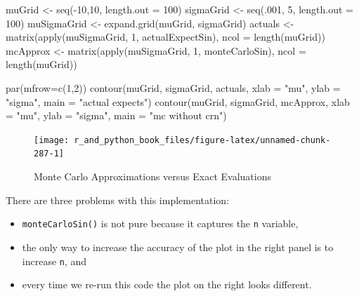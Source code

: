\documentclass[
  12pt,
  krantz2]{krantz}
\makeatletter
\newenvironment{Shaded}{\begin{snugshade}}{\end{snugshade}}
\newcommand{\AttributeTok}[1]{\textcolor[rgb]{0.61,0.61,0.61}{#1}}
\newcommand{\DecValTok}[1]{\textcolor[rgb]{0.06,0.06,0.06}{#1}}
\newcommand{\FunctionTok}[1]{\textcolor[rgb]{0,0,0}{#1}}
\newcommand{\NormalTok}[1]{#1}
\newcommand{\OtherTok}[1]{\textcolor[rgb]{0.37,0.37,0.37}{#1}}
\newcommand{\SpecialCharTok}[1]{\textcolor[rgb]{0,0,0}{#1}}
\newcommand{\StringTok}[1]{\textcolor[rgb]{0.5,0.5,0.5}{#1}}
\providecommand{\tightlist}{%
  \setlength{\itemsep}{0pt}\setlength{\parskip}{0pt}}
\newenvironment{kframe}{%
\medskip{}
\setlength{\fboxsep}{.8em}
 \def\at@end@of@kframe{}%
 \ifinner\ifhmode%
  \def\at@end@of@kframe{\end{minipage}}%
  \begin{minipage}{\columnwidth}%
 \fi\fi%
 \def\FrameCommand##1{\hskip\@totalleftmargin \hskip-\fboxsep
 \colorbox{shadecolor}{##1}\hskip-\fboxsep
     \hskip-\linewidth \hskip-\@totalleftmargin \hskip\columnwidth}%
 \MakeFramed {\advance\hsize-\width
   \@totalleftmargin\z@ \linewidth\hsize
   \@setminipage}}%
 {\par\unskip\endMakeFramed%
 \at@end@of@kframe}
\renewenvironment{Shaded}{\begin{kframe}}{\end{kframe}}
\makeatother
\begin{document}
\begin{Shaded}
\begin{Highlighting}[]
\NormalTok{muGrid }\OtherTok{\textless{}{-}} \FunctionTok{seq}\NormalTok{(}\SpecialCharTok{{-}}\DecValTok{10}\NormalTok{,}\DecValTok{10}\NormalTok{, }\AttributeTok{length.out =} \DecValTok{100}\NormalTok{)}
\NormalTok{sigmaGrid }\OtherTok{\textless{}{-}} \FunctionTok{seq}\NormalTok{(.}\DecValTok{001}\NormalTok{, }\DecValTok{5}\NormalTok{, }\AttributeTok{length.out =} \DecValTok{100}\NormalTok{)}
\NormalTok{muSigmaGrid }\OtherTok{\textless{}{-}} \FunctionTok{expand.grid}\NormalTok{(muGrid, sigmaGrid)}
\NormalTok{actuals }\OtherTok{\textless{}{-}}  \FunctionTok{matrix}\NormalTok{(}\FunctionTok{apply}\NormalTok{(muSigmaGrid, }\DecValTok{1}\NormalTok{, actualExpectSin), }
                   \AttributeTok{ncol =} \FunctionTok{length}\NormalTok{(muGrid))}
\NormalTok{mcApprox }\OtherTok{\textless{}{-}} \FunctionTok{matrix}\NormalTok{(}\FunctionTok{apply}\NormalTok{(muSigmaGrid, }\DecValTok{1}\NormalTok{, monteCarloSin), }
                   \AttributeTok{ncol =} \FunctionTok{length}\NormalTok{(muGrid))}

\FunctionTok{par}\NormalTok{(}\AttributeTok{mfrow=}\FunctionTok{c}\NormalTok{(}\DecValTok{1}\NormalTok{,}\DecValTok{2}\NormalTok{))}
\FunctionTok{contour}\NormalTok{(muGrid, sigmaGrid, actuals, }
        \AttributeTok{xlab =} \StringTok{"mu"}\NormalTok{, }\AttributeTok{ylab =} \StringTok{"sigma"}\NormalTok{, }\AttributeTok{main =} \StringTok{"actual expects"}\NormalTok{)}
\FunctionTok{contour}\NormalTok{(muGrid, sigmaGrid, mcApprox, }
        \AttributeTok{xlab =} \StringTok{"mu"}\NormalTok{, }\AttributeTok{ylab =} \StringTok{"sigma"}\NormalTok{, }\AttributeTok{main =} \StringTok{"mc without crn"}\NormalTok{)}
\end{Highlighting}
\end{Shaded}

\begin{figure}

{\centering \texttt{[image: r\_and\_python\_book\_files/figure-latex/unnamed-chunk-287-1]} 

}

\caption{Monte Carlo Approximations versus Exact Evaluations}\label{fig:unnamed-chunk-287}
\end{figure}

There are three problems with this implementation:

\begin{itemize}
\tightlist
\item
  \texttt{monteCarloSin()} is not pure because it captures the \texttt{n} variable,
\item
  the only way to increase the accuracy of the plot in the right panel is to increase \texttt{n}, and
\item
  every time we re-run this code the plot on the right looks different.
\end{itemize}
\end{document}
